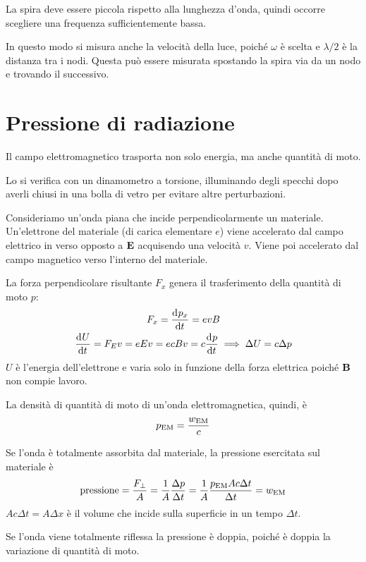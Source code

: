 La spira deve essere piccola rispetto alla lunghezza d'onda, quindi occorre scegliere una frequenza sufficientemente bassa.

In questo modo si misura anche la velocità della luce, poiché $\omega$ è scelta e $\lambda/2$ è la distanza tra i nodi.
Questa può essere misurata spostando la spira via da un nodo e trovando il successivo.



\section{Pressione di radiazione}

Il campo elettromagnetico trasporta non solo energia, ma anche quantità di moto.

Lo si verifica con un dinamometro a torsione, illuminando degli specchi dopo averli chiusi in una bolla di vetro per evitare altre perturbazioni.

Consideriamo un'onda piana che incide perpendicolarmente un materiale.
Un'elettrone del materiale (di carica elementare $e$) viene accelerato dal campo elettrico in verso opposto a $\mathbf{E}$ acquisendo una velocità $v$.
Viene poi accelerato dal campo magnetico verso l'interno del materiale.

La forza perpendicolare risultante $F_x$ genera il trasferimento della quantità di moto $p$:
\begin{gather}
    F_x = \der[p_x]{t} = e v B \\
    \der[U]{t} = F_E v = e E v = e c B v = c \der[p]{t}
    \implies \Delta U = c \Delta p
\end{gather}
$U$ è l'energia dell'elettrone e varia solo in funzione della forza elettrica poiché $\mathbf{B}$ non compie lavoro.

La densità di quantità di moto di un'onda elettromagnetica, quindi, è
\begin{equation}
    p_\mathrm{EM} = \frac{w_\mathrm{EM}}{c}
\end{equation}

Se l'onda è totalmente assorbita dal materiale, la pressione esercitata sul materiale è
\begin{equation}
    \text{pressione} = \frac{F_\perp}{A} = \frac{1}{A} \frac{\Delta p}{\Delta t}
    = \frac{1}{A} \frac{p_\mathrm{EM} A c \Delta t}{\Delta t}
    = w_\mathrm{EM}
\end{equation}
$A c \Delta t = A \Delta x$ è il volume che incide sulla superficie in un tempo $\Delta t$.

Se l'onda viene totalmente riflessa la pressione è doppia, poiché è doppia la variazione di quantità di moto.

